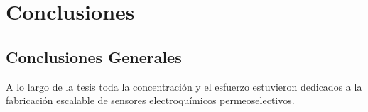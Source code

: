  \newcommand{\NoBiblioConc}[1]{
 \ifthenelse{\equal{#1}{verdadero}}{}{}
 \NoBiblioConc{verdadero}}

 	
 \FormatoCapituloUnaLinea
 
 \chapter{Conclusiones}
 \label{chap:Conclusiones}

 \thispagestyle{empty}
	


 \vfill
 \minitoc
 \newpage

\section{Conclusiones Generales}

A lo largo de la tesis toda la concentración y el esfuerzo estuvieron dedicados a la fabricación escalable de sensores electroquímicos permeoselectivos. 

